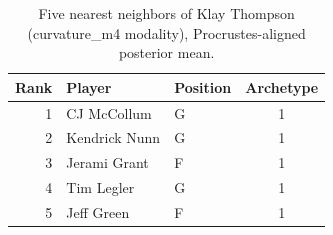 \begin{table}[htbp]
  \centering\small
  \begin{tabular}{rllc}
    \toprule
    Rank & Player & Position & Archetype \\
    \midrule
    1 & CJ McCollum & G & 1 \\
    2 & Kendrick Nunn & G & 1 \\
    3 & Jerami Grant & F & 1 \\
    4 & Tim Legler & G & 1 \\
    5 & Jeff Green & F & 1 \\
    \bottomrule
  \end{tabular}
  \caption{Five nearest neighbors of Klay Thompson (curvature_m4 modality), Procrustes-aligned posterior mean.}
  \label{tab:Klay_Thompson_neighbors_curvature_m4}
\end{table}


